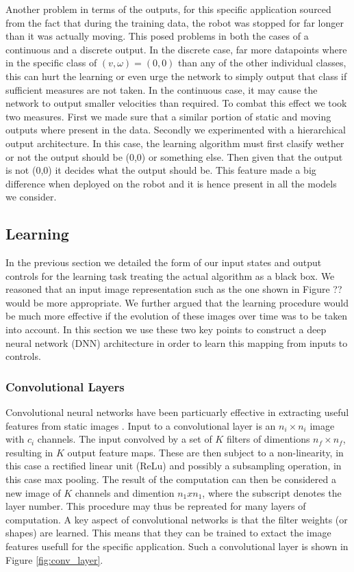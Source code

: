 \documentclass[a4paper,11pt]{report}
\begin{document}
Another problem in terms of the outputs, for this specific application sourced from the fact that during the training data, the robot was stopped for far longer than it was actually moving. This posed problems in both the cases of a continuous and a discrete output. In the discrete case, far more datapoints where in the specific class of $(v,\omega) = (0,0)$ than any of the other individual classes, this can hurt the learning or even urge the network to simply output that class if sufficient measures are not taken. In the continuous case, it may cause the network to output smaller velocities than required. To combat this effect we took two measures. First we made sure that a similar portion of static and moving outputs where present in the data. Secondly we experimented with a hierarchical output architecture. In this case, the learning algorithm must first clasify wether or not the output should be (0,0) or something else. Then given that the output is not (0,0) it decides what the output should be. This feature made a big difference when deployed on the robot and it is hence present in all the models we consider.


\subsection{Learning} \label{sec:dnn_arch}

In the previous section we detailed the form of our input states and output controls for the learning task treating the actual algorithm as a black box. We reasoned that an input image representation such as the one shown in Figure ?? would be more appropriate. We further argued that the learning procedure would be much more effective if the evolution of these images over time was to be taken into account. In this section we use these two key points to construct a deep neural network (DNN) architecture in order to learn this mapping from inputs to controls.

\subsubsection{Convolutional Layers}
Convolutional neural networks have been particuarly effective in extracting useful features from static images \cite{krizhevsky2012imagenet}. Input to a convolutional layer is an $n_i \times n_i$ image with $c_i$ channels. The input convolved by a set of $K$ filters of dimentions $n_f \times n_f$, resulting in $K$ output feature maps. These are then subject to a non-linearity, in this case a rectified linear unit (ReLu) and possibly a subsampling operation, in this case max pooling. The result of the computation can then be considered a new image of $K$ channels and dimention $n_1xn_1$, where the subscript denotes the layer number. This procedure may thus be repreated for many layers of computation. A key aspect of convolutional networks is that the filter weights (or shapes) are learned. This means that they can be trained to extact the image features usefull for the specific application. Such a convolutional layer is shown in Figure \ref{fig:conv_layer}.
\end{document}
